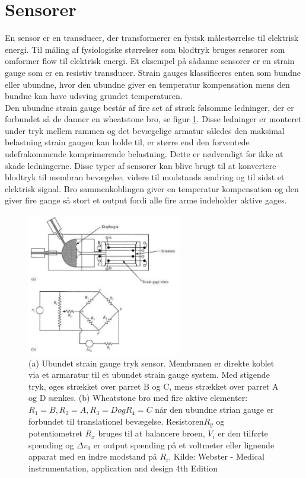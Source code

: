 \section{Sensorer}
En sensor er en transducer, der transformerer en fysisk målestørrelse til elektrisk energi. Til måling af fysiologiske størrelser som blodtryk bruges sensorer som omformer flow til elektrisk energi. Et eksempel på sådanne sensorer er en strain gauge som er en resistiv transducer. Strain gauges klassificeres enten som bundne eller ubundne, hvor den ubundne giver en temperatur kompensation mens den bundne kan have udsving grundet temperaturen.\\
Den ubundne strain gauge består af fire set af stræk følsomme ledninger, der er forbundet så de danner en wheatstone bro, se figur \ref{StrainGauge}. Disse ledninger er monteret under tryk mellem rammen og det bevægelige armatur således den maksimal belastning strain gaugen kan holde til, er større end den forventede udefrakommende komprimerende belastning. Dette er nødvendigt for ikke at skade ledningerne. Disse typer af sensorer kan blive brugt til at konvertere blodtryk til membran bevægelse, videre til modstands ændring og til sidst et elektrisk signal. Bro sammenkoblingen giver en temperatur kompensation og den giver fire gange så stort et output fordi alle fire arme indeholder aktive gages.\\
\begin{figure}[H]
	\centering
	\includegraphics[width=0.6\textwidth]{Figurer/Hardware/straingauge}
	\caption{(a) Ubundet strain gauge tryk sensor. Membranen er direkte koblet via et armaratur til et ubundet strain gauge system. Med stigende tryk, øges strækket over parret B og C, mens strækket over parret A og D sænkes. (b) Wheatstone bro med fire aktive elementer: $R_{1} = B, R_{2} = A, R_{3} = D og R_{4} = C $ når den ubundne strian gauge er forbundet til translationel bevægelse. Resistoren$ R_{y}$ og potentiometret $R_{x}$ bruges til at balancere broen, $V_{i}$ er den tilførte spænding og $\Delta v_{0}$ er output spænding på et voltmeter eller lignende apparat med en indre modstand på $R_{i}$. Kilde: Webster - Medical instrumentation, application and design 4th Edition}
	\label{StrainGauge}
\end{figure}








